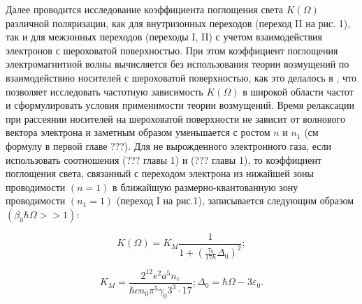 {Далее проводится исследование коэффициента поглощения света $K\left(\Omega \right)$ различной поляризации, как для внутризонных переходов (переход II на рис. 1), так и для межзонных переходов (переходы I, II) с учетом взаимодействия электронов с шероховатой поверхностью. При этом коэффициент поглощения электромагнитной волны вычисляется без использования теории возмущений по взаимодействию носителей с шероховатой поверхностью, как это делалось в \cite{Vurgaftman1999}, что позволяет исследовать частотную зависимость $K(\Omega)$ в широкой области частот и сформулировать условия применимости теории возмущений.
Время релаксации при рассеянии носителей на шероховатой поверхности не зависит от волнового вектора электрона и заметным образом уменьшается с ростом $n$ и $n_1$ (см формулу в первой главе ???). Для не вырожденного электронного газа, если использовать соотношения (??? главы 1) и (??? главы 1), то коэффициент поглощения света, связанный с переходом электрона из нижайшей зоны проводимости $(n=1)$ в ближайшую размерно-квантованную зону проводимости $(n_1=1)$ (переход I на рис.1), записывается следующим образом $(\beta _0\hbar \Omega >>1)$:

\begin{equation} \label{eq:21_10}
K \left(\Omega \right)=K_{M} \frac{1}{1+\left(\frac{\tau _{0} }{17\hbar } \Delta _{0} \right)^{2} } ;
\end{equation} 

\[
K_{M} =\frac{2^{12} e^{2} a^{5} n_{e} }{\hbar cn_{0} \pi ^{5} \gamma _{0} 3^{3} \cdot 17} ; \Delta _{0} =\hbar \Omega -3\varepsilon _{0}.
\]

}
